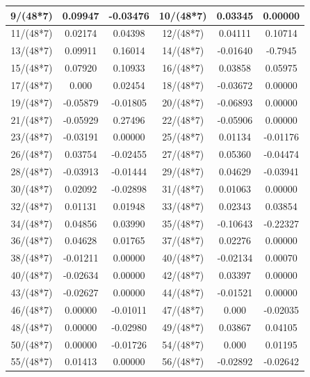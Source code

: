 \documentclass[12pt,msc]{uom_eee_dissertation_casson}
\begin{document}
\begin{table}
\begin{tabular}{| c | c | c | c | c | c |}
9/(48*7)         &  0.09947&-0.03476&10/(48*7)         &  0.03345&  0.00000 \\ \hline
11/(48*7)        &  0.02174& 0.04398&12/(48*7)         &  0.04111&  0.10714\\ \hline
13/(48*7)        &  0.09911& 0.16014&14/(48*7)         & -0.01640&  -0.7945 \\ \hline
15/(48*7)        &  0.07920& 0.10933&16/(48*7)         &  0.03858&  0.05975\\ \hline
17/(48*7)        &  0.000  & 0.02454&18/(48*7)         & -0.03672&  0.00000  \\ \hline
19/(48*7)        & -0.05879&-0.01805&20/(48*7)         & -0.06893&  0.00000  \\ \hline
21/(48*7)        & -0.05929& 0.27496&22/(48*7)         & -0.05906&  0.00000 \\ \hline
23/(48*7)        & -0.03191& 0.00000&25/(48*7)         &  0.01134& -0.01176\\ \hline
26/(48*7)        &  0.03754&-0.02455&27/(48*7)         &  0.05360& -0.04474\\ \hline
28/(48*7)        & -0.03913&-0.01444&29/(48*7)         &  0.04629& -0.03941\\ \hline
30/(48*7)        &  0.02092&-0.02898&31/(48*7)         &  0.01063& 0.00000\\ \hline
32/(48*7)        &  0.01131& 0.01948&33/(48*7)         &  0.02343& 0.03854\\ \hline
34/(48*7)        &  0.04856& 0.03990&35/(48*7)         & -0.10643&-0.22327\\ \hline
36/(48*7)        &  0.04628& 0.01765&37/(48*7)         &  0.02276& 0.00000\\ \hline
38/(48*7)        & -0.01211& 0.00000&40/(48*7)         & -0.02134& 0.00070\\ \hline
40/(48*7)        & -0.02634& 0.00000&42/(48*7)         &  0.03397& 0.00000\\ \hline
43/(48*7)        & -0.02627& 0.00000&44/(48*7)         & -0.01521& 0.00000 \\ \hline
46/(48*7)        &  0.00000&-0.01011&47/(48*7)         &  0.000  &-0.02035\\ \hline
48/(48*7)        &  0.00000&-0.02980&49/(48*7)         &  0.03867& 0.04105\\ \hline
50/(48*7)        &  0.00000&-0.01726&54/(48*7)         &  0.000  & 0.01195\\ \hline
55/(48*7)        &  0.01413& 0.00000&56/(48*7)         & -0.02892&-0.02642\\ \hline

\end{tabular}
\end{table}
\end{document}
